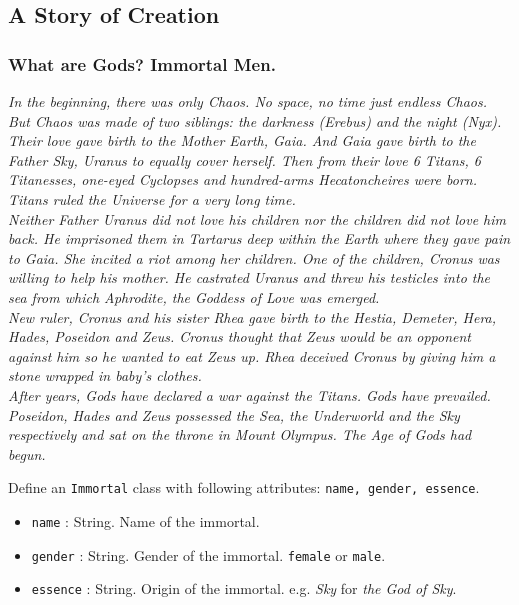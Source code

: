 \documentclass[a4paper]{article}
\begin{document}
\subsection{A Story of Creation}

\subsubsection{What are Gods? Immortal Men.}

\textit{In the beginning, there was only Chaos. No space, no time just endless Chaos. But Chaos was made of two siblings: the darkness (Erebus) and the night (Nyx). Their love gave birth to the Mother Earth, Gaia. And Gaia gave birth to the Father Sky, Uranus to equally cover herself. Then from their love 6 Titans, 6 Titanesses, one-eyed Cyclopses and hundred-arms Hecatoncheires were born. Titans ruled the Universe for a very long time.\\
Neither Father Uranus did not love his children nor the children did not love him back. He imprisoned them in Tartarus deep within the Earth where they gave pain to Gaia. She incited a riot among her children. One of the children, Cronus was willing to help his mother. He castrated Uranus and threw his testicles into the sea from which Aphrodite, the Goddess of Love was emerged.\\
New ruler, Cronus and his sister Rhea gave birth to the Hestia, Demeter, Hera, Hades, Poseidon and Zeus. Cronus thought that Zeus would be an opponent against him so he wanted to eat Zeus up. Rhea deceived Cronus by giving him a stone wrapped in baby's clothes.\\
After years, Gods have declared a war against the Titans. Gods have prevailed. Poseidon, Hades and Zeus possessed the Sea, the Underworld and the Sky respectively and sat on the throne in Mount Olympus. The Age of Gods had begun.}

Define an \texttt{Immortal} class with following attributes: \texttt{name, gender, essence}.

\begin{itemize}
    \item \texttt{name} : String. Name of the immortal.
    \item \texttt{gender} : String. Gender of the immortal. \texttt{female} or \texttt{male}.
    \item \texttt{essence} : String. Origin of the immortal. e.g. \textit{Sky} for \textit{the God of Sky}.
\end{itemize}
\end{document}
